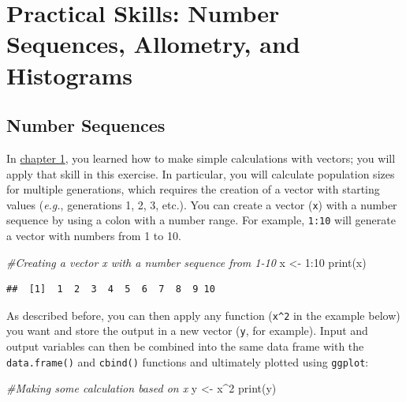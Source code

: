 \documentclass[
]{book}
\newenvironment{Shaded}{\begin{snugshade}}{\end{snugshade}}
\newcommand{\CommentTok}[1]{\textcolor[rgb]{0.56,0.35,0.01}{\textit{#1}}}
\newcommand{\DecValTok}[1]{\textcolor[rgb]{0.00,0.00,0.81}{#1}}
\newcommand{\FunctionTok}[1]{\textcolor[rgb]{0.00,0.00,0.00}{#1}}
\newcommand{\NormalTok}[1]{#1}
\newcommand{\OtherTok}[1]{\textcolor[rgb]{0.56,0.35,0.01}{#1}}
\newcommand{\SpecialCharTok}[1]{\textcolor[rgb]{0.00,0.00,0.00}{#1}}
\begin{document}
\hypertarget{practical-skills-number-sequences-allometry-and-histograms}{%
\section{Practical Skills: Number Sequences, Allometry, and Histograms}\label{practical-skills-number-sequences-allometry-and-histograms}}

\hypertarget{number-sequences}{%
\subsection{Number Sequences}\label{number-sequences}}

In \href{what-evolution-is.html\#some-r-and-rstudio-basics2}{chapter 1}, you learned how to make simple calculations with vectors; you will apply that skill in this exercise. In particular, you will calculate population sizes for multiple generations, which requires the creation of a vector with starting values (\emph{e.g.}, generations 1, 2, 3, etc.). You can create a vector (\texttt{x}) with a number sequence by using a colon with a number range. For example, \texttt{1:10} will generate a vector with numbers from 1 to 10.

\begin{Shaded}
\begin{Highlighting}[]
\CommentTok{\#Creating a vector x with a number sequence from 1{-}10}
\NormalTok{x }\OtherTok{\textless{}{-}} \DecValTok{1}\SpecialCharTok{:}\DecValTok{10}
\FunctionTok{print}\NormalTok{(x)}
\end{Highlighting}
\end{Shaded}

\begin{verbatim}
##  [1]  1  2  3  4  5  6  7  8  9 10
\end{verbatim}

As described before, you can then apply any function (\texttt{x\^{}2} in the example below) you want and store the output in a new vector (\texttt{y}, for example). Input and output variables can then be combined into the same data frame with the \texttt{data.frame()} and \texttt{cbind()} functions and ultimately plotted using \texttt{ggplot}:

\begin{Shaded}
\begin{Highlighting}[]
\CommentTok{\#Making some calculation based on x}
\NormalTok{y }\OtherTok{\textless{}{-}}\NormalTok{ x}\SpecialCharTok{\^{}}\DecValTok{2}
\FunctionTok{print}\NormalTok{(y)}
\end{Highlighting}
\end{Shaded}
\end{document}
